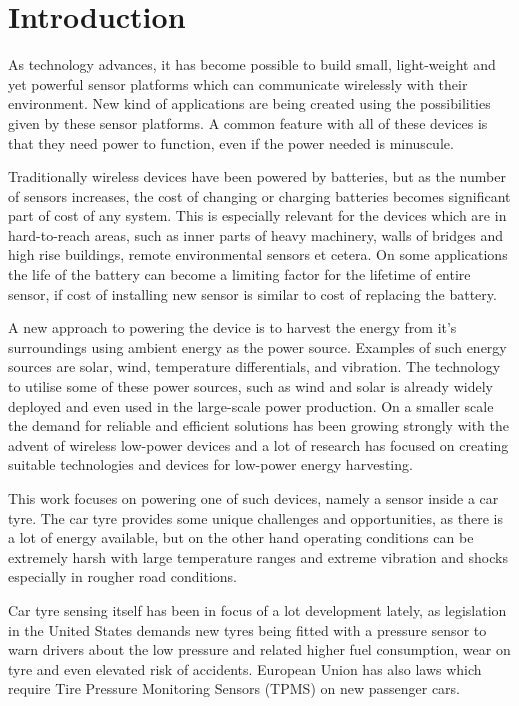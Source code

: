 \section{Introduction}

\thispagestyle{empty}

As technology advances, it has become possible to build small, light-weight and yet powerful sensor platforms which can communicate wirelessly with their environment. New kind of applications are being created using the possibilities given by these sensor platforms. A common feature with all of these devices is that they need power to function, even if the power needed is minuscule. 

Traditionally wireless devices have been powered by batteries, but as the number of sensors increases, the cost of changing or charging batteries becomes significant part of cost of any system. This is especially relevant for the devices which are in hard-to-reach areas, such as inner parts of heavy machinery, walls of bridges and high rise buildings, remote environmental sensors et cetera. On some applications the life of the battery can become a limiting factor for the lifetime of entire sensor, if cost of installing new sensor is similar to cost of replacing the battery.

A new approach to powering the device is to harvest the energy from it's surroundings using ambient energy as the power source. Examples of such energy sources are solar, wind, temperature differentials, and vibration. The technology to utilise some of these power sources, such as wind and solar is already widely deployed and even used in the large-scale power production. On a smaller scale the demand for reliable and efficient solutions has been growing strongly with the advent of wireless low-power devices and a lot of research has focused on creating suitable technologies and devices for low-power energy harvesting. 

This work focuses on powering one of such devices, namely a sensor inside a car tyre. The car tyre provides some unique challenges and opportunities, as there is a lot of energy available, but on the other hand operating conditions can be extremely harsh with large temperature ranges and extreme vibration and shocks especially in rougher road conditions.

Car tyre sensing itself has been in focus of a lot development lately, as legislation in the United States demands new tyres being fitted with a pressure sensor to warn drivers about the low pressure and related higher fuel consumption, wear on tyre and even elevated risk of accidents. European Union has also laws which require Tire Pressure Monitoring Sensors (TPMS) on new passenger cars. 

